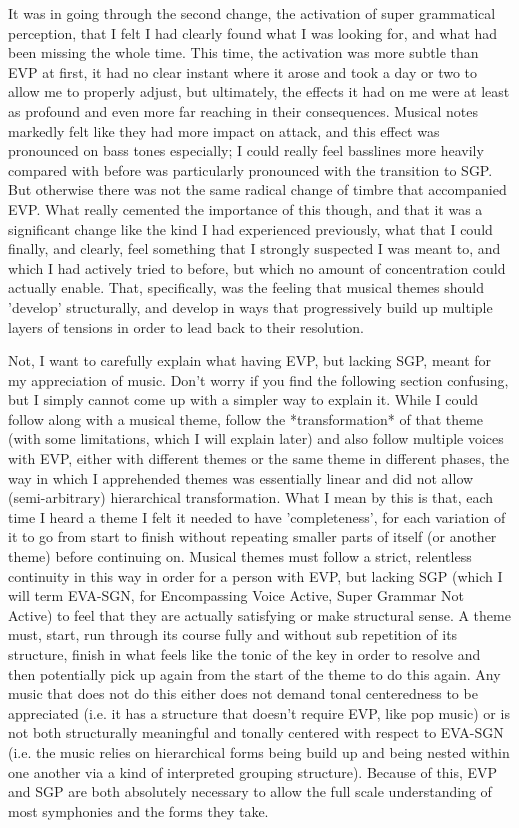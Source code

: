 \documentclass[]{article}
\begin{document}
It was in going through the second change, the activation of super grammatical perception, that I felt I had clearly found what I was looking for, and what had been missing the whole time. This time, the activation was more subtle than EVP at first, it had no clear instant where it arose and took a day or two to allow me to properly adjust, but ultimately, the effects it had on me were at least as profound and even more far reaching in their consequences. Musical notes markedly felt like they had more impact on attack, and this effect was pronounced on bass tones especially; I could really feel basslines more heavily compared with before was particularly pronounced with the transition to SGP. But otherwise there was not the same radical change of timbre that accompanied EVP. What really cemented the importance of this though, and that it was a significant change like the kind I had experienced previously, what that I could finally, and clearly, feel something that I strongly suspected I was meant to, and which I had actively tried to before, but which no amount of concentration could actually enable. That, specifically, was the feeling that musical themes should 'develop' structurally, and develop in ways that progressively build up multiple layers of tensions in order to lead back to their resolution.

Not, I want to carefully explain what having EVP, but lacking SGP, meant for my appreciation of music. Don't worry if you find the following section confusing, but I simply cannot come up with a simpler way to explain it. While I could follow along with a musical theme, follow the *transformation* of that theme (with some limitations, which I will explain later) and also follow multiple voices with EVP, either with different themes or the same theme in different phases, the way in which I apprehended themes was essentially linear and did not allow (semi-arbitrary) hierarchical transformation. What I mean by this is that, each time I heard a theme I felt it needed to have 'completeness', for each variation of it to go from start to finish without repeating smaller parts of itself (or another theme) before continuing on. Musical themes must follow a strict, relentless continuity in this way in order for a person with EVP, but lacking SGP (which I will term EVA-SGN, for Encompassing Voice Active, Super Grammar Not Active) to feel that they are actually satisfying or make structural sense. A theme must, start, run through its course fully and without  sub repetition of its structure, finish in what feels like the tonic of the key in order to resolve and then potentially pick up again from the start of the theme to do this again. Any music that does not do this either does not demand tonal centeredness to be appreciated (i.e. it has a structure that doesn't require EVP, like pop music) or is not both structurally meaningful and tonally centered with respect to EVA-SGN (i.e. the music relies on hierarchical forms being build up and being nested within one another via a kind of interpreted grouping structure). Because of this, EVP and SGP are both absolutely necessary to allow the full scale understanding of most symphonies and the forms they take.
\end{document}

